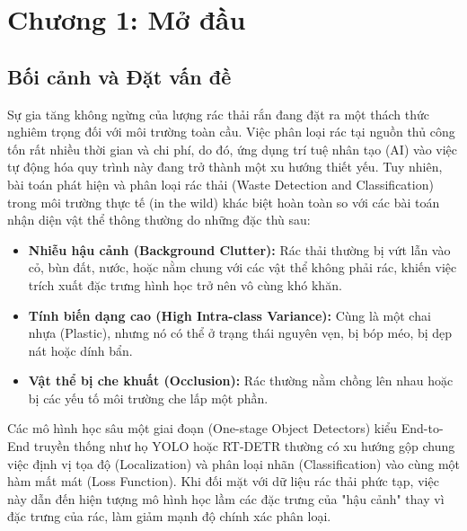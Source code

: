 \documentclass[12pt, a4paper]{article}
\begin{document}
\section{Chương 1: Mở đầu}
\subsection{Bối cảnh và Đặt vấn đề}
Sự gia tăng không ngừng của lượng rác thải rắn đang đặt ra một thách thức nghiêm trọng đối với môi trường toàn cầu. Việc phân loại rác tại nguồn thủ công tốn rất nhiều thời gian và chi phí, do đó, ứng dụng trí tuệ nhân tạo (AI) vào việc tự động hóa quy trình này đang trở thành một xu hướng thiết yếu. Tuy nhiên, bài toán phát hiện và phân loại rác thải (Waste Detection and Classification) trong môi trường thực tế (in the wild) khác biệt hoàn toàn so với các bài toán nhận diện vật thể thông thường do những đặc thù sau:
\begin{itemize}
    \item \textbf{Nhiễu hậu cảnh (Background Clutter):} Rác thải thường bị vứt lẫn vào cỏ, bùn đất, nước, hoặc nằm chung với các vật thể không phải rác, khiến việc trích xuất đặc trưng hình học trở nên vô cùng khó khăn.
    \item \textbf{Tính biến dạng cao (High Intra-class Variance):} Cùng là một chai nhựa (Plastic), nhưng nó có thể ở trạng thái nguyên vẹn, bị bóp méo, bị dẹp nát hoặc dính bẩn.
    \item \textbf{Vật thể bị che khuất (Occlusion):} Rác thường nằm chồng lên nhau hoặc bị các yếu tố môi trường che lấp một phần.
\end{itemize}
Các mô hình học sâu một giai đoạn (One-stage Object Detectors) kiểu End-to-End truyền thống như họ YOLO hoặc RT-DETR thường có xu hướng gộp chung việc định vị tọa độ (Localization) và phân loại nhãn (Classification) vào cùng một hàm mất mát (Loss Function). Khi đối mặt với dữ liệu rác thải phức tạp, việc này dẫn đến hiện tượng mô hình học lầm các đặc trưng của "hậu cảnh" thay vì đặc trưng của rác, làm giảm mạnh độ chính xác phân loại.
\end{document}
